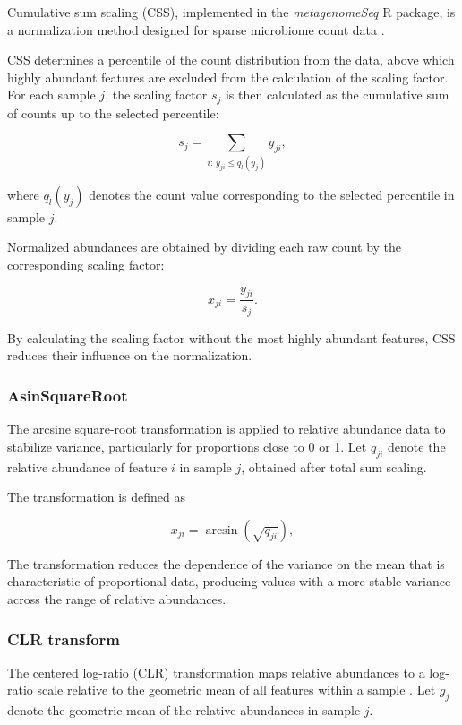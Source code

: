 \begin{bibunit}[apalike]
\begin{appendices}
Cumulative sum scaling (CSS), implemented in the \textit{metagenomeSeq} R package, is a normalization method designed for sparse microbiome count data \citep{paulson_differential_2013}.

CSS determines a percentile of the count distribution from the data, above which highly abundant features are excluded from the calculation of the scaling factor. For each sample $j$, the scaling factor $s_j$ is then calculated as the cumulative sum of counts up to the selected percentile:

$$
s_j=\sum_{i:\,y_{ji}\le q_{\hat l}(y_j)}y_{ji},
$$

where $q_{\hat l}(y_j)$ denotes the count value corresponding to the selected percentile in sample $j$.

Normalized abundances are obtained by dividing each raw count by the corresponding scaling factor:

$$
x_{ji}=\frac{y_{ji}}{s_j}.
$$

By calculating the scaling factor without the most highly abundant features, CSS reduces their influence on the normalization.


\subsubsection*{AsinSquareRoot}

The arcsine square-root transformation is applied to relative abundance data to stabilize variance, particularly for proportions close to 0 or 1. Let $q_{ji}$ denote the relative abundance of feature $i$ in sample $j$, obtained after total sum scaling.

The transformation is defined as

\[
x_{ji} = \arcsin\left(\sqrt{q_{ji}}\right),
\]

The transformation reduces the dependence of the variance on the mean that is characteristic of proportional data, producing values with a more stable variance across the range of relative abundances.

\subsubsection*{CLR transform}

The centered log-ratio (CLR) transformation maps relative abundances to a log-ratio scale relative to the geometric mean of all features within a sample \citep{aitchison_statistical_1982}. Let $g_j$ denote the geometric mean of the relative abundances in sample $j$.


\end{appendices}
\end{bibunit}
